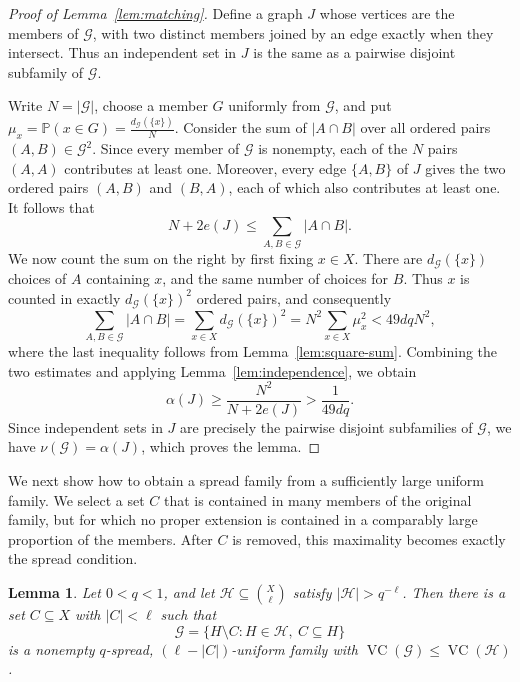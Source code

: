 \documentclass[11pt]{article}
\newtheorem{lemma}[theorem]{Lemma}
\theoremstyle{definition}
\newcommand*{\abs}[1]{\lvert#1\rvert}
\newcommand{\cG}{\mathcal{G}}
\newcommand{\cH}{\mathcal{H}}
\newcommand{\VC}{\operatorname{VC}}
\begin{document}
\begin{proof}[Proof of Lemma~\ref{lem:matching}]
Define a graph \(J\) whose vertices are the members of \(\cG\), with two distinct members joined by an edge exactly when they intersect. Thus an independent set in \(J\) is the same as a pairwise disjoint subfamily of \(\cG\).

Write \(N=\abs{\cG}\), choose a member \(G\) uniformly from \(\cG\), and put \(\mu_{x}=\mathbb{P}(x\in G)=\frac{d_{\cG}(\{x\})}{N}\). Consider the sum of \(\abs{A\cap B}\) over all ordered pairs \((A,B)\in\cG^{2}\). Since every member of \(\cG\) is nonempty, each of the \(N\) pairs \((A,A)\) contributes at least one. Moreover, every edge \(\{A,B\}\) of \(J\) gives the two ordered pairs \((A,B)\) and \((B,A)\), each of which also contributes at least one. It follows that
\[
N+2e(J)\le\sum_{A,B\in\cG}\abs{A\cap B}.
\]
We now count the sum on the right by first fixing \(x\in X\). There are \(d_{\cG}(\{x\})\) choices of \(A\) containing \(x\), and the same number of choices for \(B\). Thus \(x\) is counted in exactly \(d_{\cG}(\{x\})^{2}\) ordered pairs, and consequently
\begin{equation*}
\sum_{A,B\in\cG}\abs{A\cap B}
=\sum_{x\in X}d_{\cG}(\{x\})^{2}
=N^{2}\sum_{x\in X}\mu_{x}^{2}
<49dqN^{2},
\end{equation*}
where the last inequality follows from Lemma~\ref{lem:square-sum}. Combining the two estimates and applying Lemma~\ref{lem:independence}, we obtain
\[
\alpha(J)\ge\frac{N^{2}}{N+2e(J)}>\frac{1}{49dq}.
\]
Since independent sets in \(J\) are precisely the pairwise disjoint subfamilies of \(\cG\), we have \(\nu(\cG)=\alpha(J)\), which proves the lemma.
\end{proof}

We next show how to obtain a spread family from a sufficiently large uniform family. We select a set \(C\) that is contained in many members of the original family, but for which no proper extension is contained in a comparably large proportion of the members. After \(C\) is removed, this maximality becomes exactly the spread condition.

\begin{lemma}\label{lem:maximal-kernel}
Let \(0<q<1\), and let \(\cH\subseteq\binom{X}{\ell}\) satisfy \(\abs{\cH}>q^{-\ell}\). Then there is a set \(C\subseteq X\) with \(\abs{C}<\ell\) such that
\[
\cG=\{H\setminus C:H\in\cH,\ C\subseteq H\}
\]
is a nonempty \(q\)-spread, \((\ell-\abs{C})\)-uniform family with \(\VC(\cG)\le\VC(\cH)\).
\end{lemma}
\end{document}
